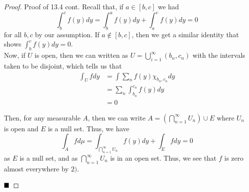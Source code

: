 \vspace{0.2cm}

\begin{proof}{Proof of 13.4 cont.}
    Recall that, if $a \in [b, c]$ we had
    \[ \int_{b}^{c}f(y)dy = \int_{b}^{a} f(y)dy + \int_{a}^{c} f(y) dy = 0 \]
    for all $b, c$ by our assumption. If $a \notin [b, c]$, then we get a similar identity that shows $\int_{b}^{c} f(y)dy = 0$.\\
 
    Now, if $U$ is open, then we can written as $U = \bigcup_{i= 1}^{\infty} (b_n, c_n)$ with the intervals taken to be disjoint, which tells us that
    \begin{align*}
        \int_{U} f dy &= \int \sum_{n} f(y)\chi_{b_n, c_n}dy\\
        &= \sum_{n} \int_{b_n}^{c_n} f(y)dy\\
        &= 0
    \end{align*}

    Then, for any measurable $A$, then we can write $A = \left(\bigcap_{n = 1}^{\infty} U_n \right) \cup E$ where $U_n$ is open and $E$ is a null set. Thus, we have
    \[ \int_{A} f d\mu = \int_{\bigcap_{n = 1}^{\infty} U_n} f(y) dy + \int_{E} f dy = 0\]
    as $E$ is a null set, and as $\bigcap_{n = 1}^{\infty} U_n$ is in an open set. Thus, we see that $f$ is zero almost everywhere by $2)$. 

    $\qed$
\end{proof}

